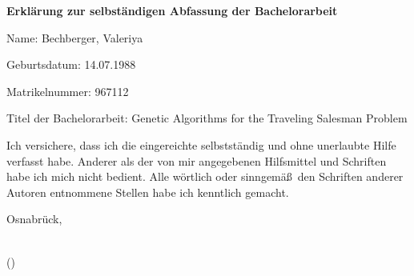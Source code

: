 \makeatletter
	\thispagestyle{empty}
	
 \begin{center}
 	\textbf{Erkl\"arung zur selbst\"andigen Abfassung der Bachelorarbeit}
 \end{center}

\vspace{1cm}
  
Name: Bechberger, Valeriya\par 

Geburtsdatum: 14.07.1988\par
 
Matrikelnummer: 967112\par 

Titel der Bachelorarbeit: Genetic Algorithms for the Traveling Salesman Problem\par 

  \vspace{2cm}
  
	Ich versichere, dass ich die eingereichte \ThesisType{}
  selbstst\"andig und ohne unerlaubte Hilfe verfasst habe.
  Anderer als der von mir angegebenen Hilfsmittel und Schriften habe ich mich nicht bedient.
  Alle w\"ortlich oder sinngem\"a\ss\ den Schriften anderer Autoren entnommene
  Stellen habe ich kenntlich gemacht.

  \vspace{1cm}

	\begin{flushright}
		Osnabr\"uck, \@date
	\end{flushright}

	\protect{\vspace{0.5cm}}
	\underline{\hspace{7cm}}\\
	(\@author)
\makeatother